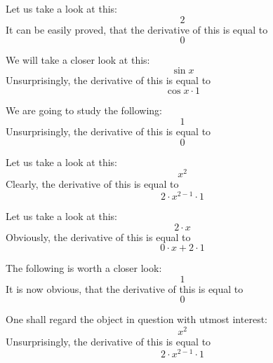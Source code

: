 \documentclass{article}
\begin{document}
Let us take a look at this:
\begin{equation}
2 
\end{equation}
It can be easily proved, that the derivative of this is equal to
\begin{equation}
0 
\end{equation}

We will take a closer look at this:
\begin{equation}
\sin x 
\end{equation}
Unsurprisingly, the derivative of this is equal to
\begin{equation}
\cos x \cdot 1 
\end{equation}

We are going to study the following:
\begin{equation}
1 
\end{equation}
Unsurprisingly, the derivative of this is equal to
\begin{equation}
0 
\end{equation}

Let us take a look at this:
\begin{equation}
x ^{2 } 
\end{equation}
Clearly, the derivative of this is equal to
\begin{equation}
2 \cdot x ^{2 - 1 } \cdot 1 
\end{equation}

Let us take a look at this:
\begin{equation}
2 \cdot x 
\end{equation}
Obviously, the derivative of this is equal to
\begin{equation}
0 \cdot x + 2 \cdot 1 
\end{equation}

The following is worth a closer look:
\begin{equation}
1 
\end{equation}
It is now obvious, that the derivative of this is equal to
\begin{equation}
0 
\end{equation}

One shall regard the object in question with utmost interest:
\begin{equation}
x ^{2 } 
\end{equation}
Unsurprisingly, the derivative of this is equal to
\begin{equation}
2 \cdot x ^{2 - 1 } \cdot 1 
\end{equation}
\end{document}
